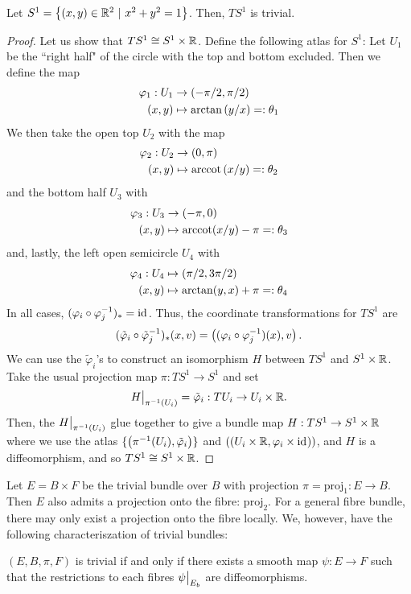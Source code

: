 \documentclass[main.tex]{subfiles}
\begin{document}
 \begin{exmp}
 Let $S^1 = \left\{ (x, y) \in \mathbb{R}^2 \ | \ x^2 + y^2 = 1 \right\}$. Then, $TS^1$ is trivial.

 \begin{proof}
 Let us show that $TS^1 \cong S^1 \times \mathbb{R}$. Define the following atlas for $S^1$: Let $U_1$ be the ``right half" of the circle with the top and bottom excluded. Then we define the map
 \begin{align*}
     \varphi_1 : U_1 &\to \left( -\pi/2, \pi/2 \right) \\
                 (x,y) &\mapsto \arctan\left( y/x \right)  =: \theta_1
\end{align*} We then take the open top $U_2$ with the map
\begin{align*}
    \varphi_2 : U_2 &\to \left( 0,\pi \right) \\
         (x,y) &\mapsto \text{arccot}\left( x/y \right) =: \theta_2
\end{align*}
and the bottom half $U_3$ with
\begin{align*}
    \varphi_3: U_3 &\to \left( -\pi, 0 \right) \\
     (x, y) &\mapsto \text{arccot}(x/y) - \pi =: \theta_3
\end{align*}
and, lastly, the left open semicircle $U_4$ with
\begin{align*}
    \varphi_4: U_4 &\mapsto \left( \pi/2, 3\pi/2 \right) \\
     (x,y) &\mapsto \arctan(y,x) + \pi =: \theta_4
\end{align*}
In all cases, $(\varphi_i \circ \varphi_j^{-1})_* = \text{id}_{}$. Thus, the coordinate transformations for $TS^1$ are
\[
(\tilde{\varphi}_i \circ \tilde{\varphi}_j^{-1})_*(x, v) = \left( (\varphi_i \circ \varphi_j^{-1})(x), v \right).
\]
We can use the $\tilde{\varphi}_i$'s to construct an isomorphism $H$ between $TS^1$ and $S^1 \times \mathbb{R}$. Take the usual projection map $\pi: TS^1\to S^1$ and set
\[
H\big|_{\pi^{-1}(U_i)} = \tilde{\varphi}_i : TU_i \to U_i \times \mathbb{R}.
\]
Then, the $H\big|_{\pi^{-1}(U_i)}$ glue together to give a bundle map $H: TS^1 \to S^1 \times \mathbb{R}$ where we use the atlas $\{\left(  \pi^{-1}(U_i), \tilde{\varphi}_i  \right) \}$ and $\left(  (U_i \times \mathbb{R}, \varphi_i \times \text{id}_{})  \right)$, and $H$ is a diffeomorphism, and so $TS^1 \cong S^1 \times \mathbb{R}$.
 \end{proof}
 \end{exmp}

 \begin{note}
 Let $E = B \times F$ be the trivial bundle over $B$ with projection $\pi = \text{proj}_1: E \to B$. Then $E$ also admits a projection onto the fibre: $\text{proj}_2$. For a general fibre bundle, there may only exist a projection onto the fibre locally. We, however, have the following characteriszation of trivial bundles:
 \end{note}

 \begin{prop}
 $(E, B, \pi, F)$ is trivial if and only if there exists a smooth  map $\psi: E \to F$ such that the restrictions to each fibres $\psi\big|_{E_b}$ are diffeomorphisms.
 \end{prop}
\end{document}
